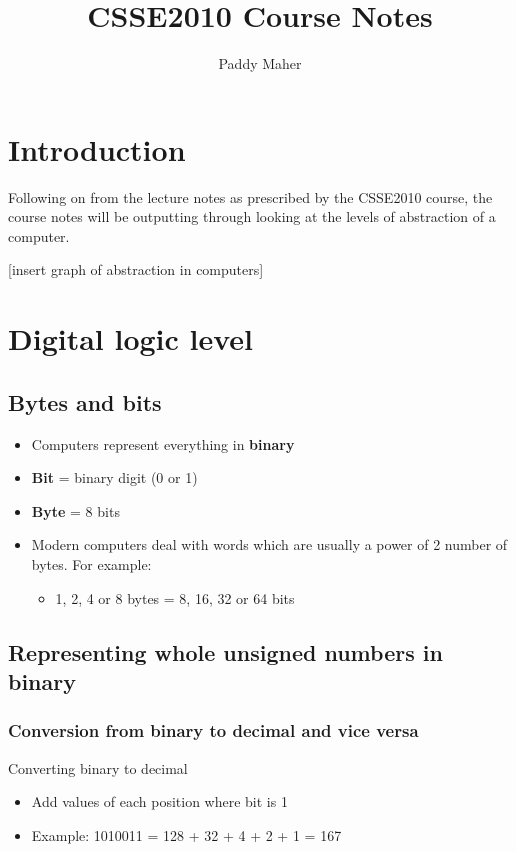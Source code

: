 \documentclass{article}
\title{CSSE2010 Course Notes}
\author{Paddy Maher}
\begin{document}
\maketitle
\newpage

\section{Introduction}
Following on from the lecture notes as prescribed by the CSSE2010 course, the course notes will be outputting through
looking at the levels of abstraction of a computer.

[insert graph of abstraction in computers]

\section{Digital logic level}

\subsection{Bytes and bits}

\begin{itemize}
\item Computers represent everything in \textbf{binary}
\item \textbf{Bit} = binary digit (0 or 1)
\item \textbf{Byte} = 8 bits
\item Modern computers deal with words which are usually a power of 2 number of bytes. For example:
\begin{itemize}
\item 1, 2, 4 or 8 bytes = 8, 16, 32 or 64 bits
\end{itemize}
\end{itemize}

\subsection{Representing whole unsigned numbers in binary}

\subsubsection{Conversion from binary to decimal and vice versa}

Converting binary to decimal
\begin{itemize}
\item Add values of each position where bit is 1
\item Example: 1010011 = 128 + 32 + 4 + 2 + 1 = 167
\end{itemize}
\end{document}

